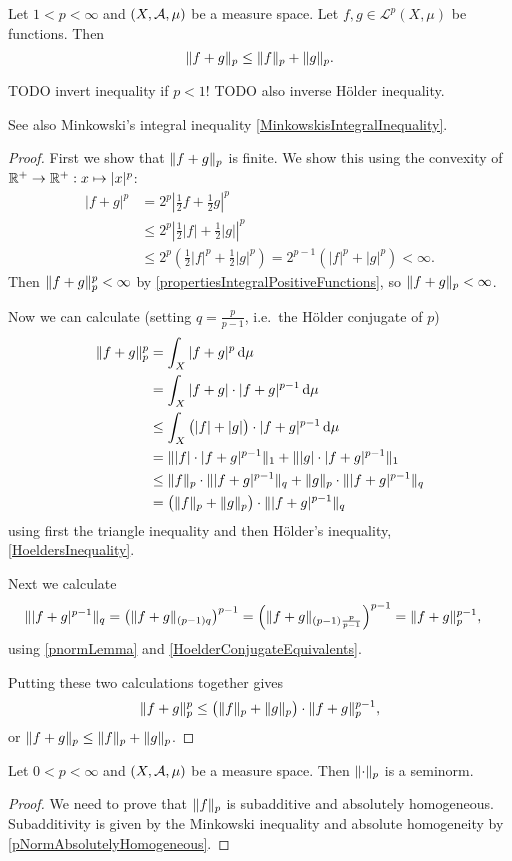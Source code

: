 \begin{theorem} \label{MinkowskisInequality}
Let $1< p<\infty$ and $\sSet{X,\mathcal{A},\mu}$ be a measure space. Let $f,g\in\mathcal{L}^p(X,\mu)$ be functions. Then
\[ \lVert f+g\rVert_p \leq \lVert f\rVert_p + \lVert g\rVert_p. \]
\end{theorem}
TODO invert inequality if $p<1$! TODO also inverse Hölder inequality.

See also Minkowski's integral inequality \ref{MinkowskisIntegralInequality}.
\begin{proof}
First we show that $\lVert f+g\rVert_p$ is finite. We show this using the convexity of $\mathbb{R}^+\to \mathbb{R}^+: x\mapsto |x|^p$:
\begin{align*}
|f+g|^p &= 2^p\left|\frac{1}{2}f+ \frac{1}{2}g\right|^p \\
&\leq 2^p\left|\frac{1}{2}|f|+ \frac{1}{2}|g|\right|^p \\
&\leq 2^p\left(\frac{1}{2}|f|^p + \frac{1}{2}|g|^p\right) = 2^{p-1}\left(|f|^p + |g|^p\right) < \infty.
\end{align*}
Then $\lVert f+g\rVert_p^p < \infty$ by \ref{propertiesIntegralPositiveFunctions}, so $\lVert f+g\rVert_p < \infty$.

Now we can calculate (setting $q = \frac{p}{p-1}$, i.e.\ the Hölder conjugate of $p$)
\begin{align*}
\lVert f+g\rVert_p^p &= \int_X|f+g|^p\operatorname{d \!}{\mu} \\
&= \int_X|f+g|\cdot |f+g|^{p-1}\operatorname{d \!}{\mu} \\
&\leq \int_X\big(|f|+|g|\big)\cdot |f+g|^{p-1}\operatorname{d \!}{\mu} \\
&= \lVert|f|\cdot |f+g|^{p-1}\rVert_1 + \lVert|g|\cdot |f+g|^{p-1}\rVert_1 \\
&\leq \lVert f\rVert_p\cdot \lVert|f+g|^{p-1}\rVert_q + \lVert g\rVert_p\cdot \lVert|f+g|^{p-1}\rVert_q \\
&= \big(\lVert f\rVert_p + \lVert g\rVert_p\big)\cdot \lVert|f+g|^{p-1}\rVert_q
\end{align*}
using first the triangle inequality and then Hölder's inequality, \ref{HoeldersInequality}.

Next we calculate
\begin{align*}
\lVert|f+g|^{p-1}\rVert_q &= \left(\lVert f+g\rVert_{(p-1)q}\right)^{p-1} = \left(\lVert f+g\rVert_{(p-1)\frac{p}{p-1}}\right)^{p-1} = \lVert f+g\rVert_{p}^{p-1},
\end{align*}
using \ref{pnormLemma} and \ref{HoelderConjugateEquivalents}.

Putting these two calculations together gives
\[ \lVert f+g\rVert_p^p \leq \big(\lVert f\rVert_p + \lVert g\rVert_p\big)\cdot \lVert f+g\rVert_{p}^{p-1}, \]
or $\lVert f+g\rVert_p \leq \lVert f\rVert_p + \lVert g\rVert_p$.
\end{proof}
\begin{corollary}
Let $0< p<\infty$ and $\sSet{X,\mathcal{A},\mu}$ be a measure space. Then $\lVert\cdot\rVert_{p}$ is a seminorm.
\end{corollary}
\begin{proof}
We need to prove that $\lVert f\rVert_{p}$ is subadditive and absolutely homogeneous. Subadditivity is given by the Minkowski inequality and absolute homogeneity by \ref{pNormAbsolutelyHomogeneous}.
\end{proof}


